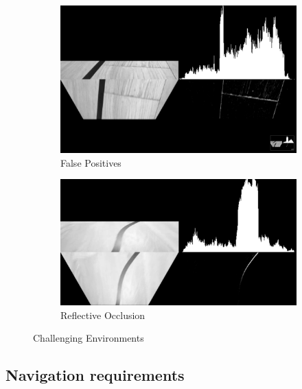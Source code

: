         \begin{figure}[H]
            \centering
            \begin{subfigure}[b]{0.45\textwidth}
                \includegraphics[width=\textwidth]{vizEnvNoise.png}
                \caption{False Positives}
                \label{fig:FalsePositives}
            \end{subfigure}
            \hfill
            \begin{subfigure}[b]{0.45\textwidth}
                \includegraphics[width=\textwidth]{vizLightOclusion.png}
                \caption{Reflective Occlusion}
                \label{fig:ReflectOcclusion}
            \end{subfigure}
            \caption{Challenging Environments}
        \end{figure}

        \subsection{Navigation requirements}

